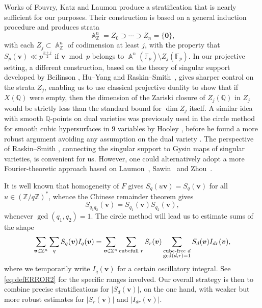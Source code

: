 \documentclass[a4paper,11pt, twoside,reqno]{amsart}
\theoremstyle{plain}
\theoremstyle{definition}
\theoremstyle{remark}
\newcommand{\bfv}{\bm{v}}
\newcommand{\ZZ}{\mathbb{Z}}
\newcommand{\QQ}{\mathbb{Q}}
\DeclareMathOperator{\A}{\mathbb{A}}
\newcommand{\FF}{\mathbb{F}}
\numberwithin{equation}{section}
\begin{document}
Works of Fouvry, Katz and Laumon \cite{KL85,FK01}
produce a stratification that is nearly sufficient for our purposes. Their construction is based on a general induction procedure and produces strata
\[\A_\ZZ^n = Z_0 \supset \cdots \supset Z_{n}=\{\mathbf 0\} ,
\]
with each $Z_j\subset\A_\ZZ^n$ of codimension at least $j$, with the property that  $S_p(\bm{v})\ll p^{\frac{n+j}{2}}$ if 
$\bm{v} \bmod{p}$ belongs to $\A^n(\FF_p)\setminus Z_{j}(\FF_p)$.
In our projective setting,
a different construction,
based on the theory of singular support
developed by Beilinson \cite{Bei},
Hu--Yang \cite{HY}
and Raskin--Smith~\cite{RS},
gives sharper control on the strata $Z_j$,
enabling us to use classical projective duality
to show that if $X(\QQ)$ were empty,
then the dimension of the Zariski closure of $Z_j(\QQ)$ in $Z_j$
would be strictly less than the standard bound for $\dim Z_j$ itself.
A similar idea with smooth $\QQ$-points on dual varieties
was previously used in the circle method for smooth cubic hypersurfaces in $9$ variables
by Hooley \cite[Lemma~2]{hooley9},
before he found a more robust argument avoiding any assumption on the dual variety
\cite{hooley9.3}.
The perspective of Raskin--Smith \cite{RS},
connecting the singular support to Gysin maps of singular varieties,
is convenient for us.
However, one could alternatively adopt a more Fourier-theoretic approach
based on Laumon~\cite{Laumon}, Sawin~\cite{Sawin} and Zhou~\cite{Zhou}.

It is well known that homogeneity of $F$ gives
$S_q(u\bfv)=S_q(\bfv)$ for all $u\in(\ZZ/q\ZZ)^\ast$,
whence the Chinese remainder theorem gives
\begin{equation}
 S_{q_1q_2}(\bfv)=S_{q_1}(\bfv)S_{q_2}(\bfv),
 \label{eq:q-exact-CRT}
\end{equation}
whenever $\gcd(q_1,q_2)=1$.
The circle method will lead us to estimate sums
of the shape
\begin{equation}\label{Eq: EnterTheDelta}
\sum_{\bfv \in \ZZ^n} \sum_q S_q(\bfv) I_q(\bfv)
= \sum_{\bfv \in \ZZ^n} \sum_{\textnormal{cubefull }r} S_r(\bfv)
\sum_{\substack{\textnormal{cube-free }d \\ \gcd(d,r)=1}} S_d(\bfv) I_{dr}(\bfv),
\end{equation}
where we temporarily write $I_q(\bfv)$
for a certain oscillatory integral.
See \eqref{eq:defERROR2} for the specific ranges involved.
Our overall strategy is then to combine precise stratifications for $|S_d(\bfv)|$,
on the one hand,
with weaker but more robust estimates for $|S_r(\bfv)|$ and $|I_{dr}(\bfv)|$.
\end{document}
